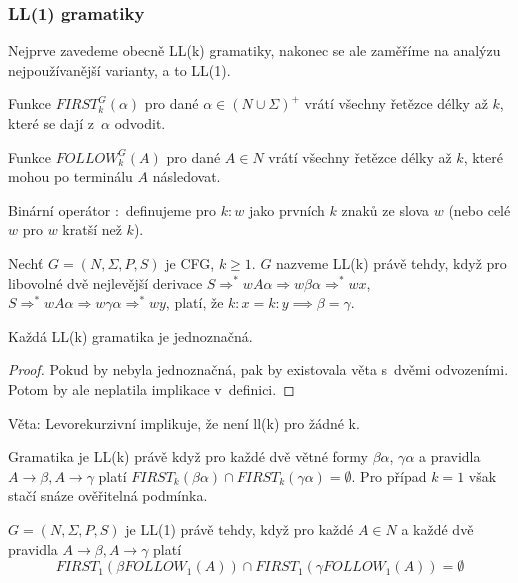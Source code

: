 \subsubsection{LL(1) gramatiky}


Nejprve zavedeme obecně LL(k) gramatiky, nakonec se ale zaměříme na
analýzu nejpoužívanější varianty, a to LL(1).

\begin{definition}
    Funkce $FIRST^G_k(\alpha)$ pro dané $\alpha \in (N \cup \Sigma)^+$
    vrátí všechny řetězce délky až $k$, které se dají z~$\alpha$
    odvodit.

    Funkce $FOLLOW^G_k(A)$ pro dané $A \in N$
    vrátí všechny řetězce délky až $k$, které mohou po terminálu $A$
    následovat.

    Binární operátor ${:}$ definujeme pro $k : w$ jako prvních $k$ znaků
    ze slova $w$ (nebo celé $w$ pro $w$ kratší než $k$).
\end{definition}

\begin{definition}
    Nechť $G = (N, \Sigma, P, S)$ je CFG, $k \geq 1$. $G$ nazveme LL(k)
    právě tehdy, když pro libovolné dvě nejlevější derivace
    $S \Rightarrow^* wA\alpha \Rightarrow w\beta\alpha \Rightarrow^* wx$,
    $S \Rightarrow^* wA\alpha \Rightarrow w\gamma\alpha \Rightarrow^* wy$,
    platí, že $k : x = k : y \implies \beta = \gamma$.
\end{definition}

\begin{theorem}
    Každá LL(k) gramatika je jednoznačná.
\end{theorem}

\begin{proof}
Pokud by nebyla jednoznačná, pak by existovala věta s~dvěmi odvozeními.
Potom by ale neplatila implikace v~definici.
\end{proof}

Věta: Levorekurzivní implikuje, že není ll(k) pro žádné k.

Gramatika je LL(k) právě když pro každé dvě větné formy $\beta \alpha$,
$\gamma \alpha$ a pravidla $A \to \beta, A \to \gamma$
platí $FIRST_k(\beta \alpha) \cap FIRST_k(\gamma \alpha) = \emptyset$.
Pro případ $k = 1$ však stačí snáze ověřitelná podmínka.

\begin{theorem}
    $G = (N, \Sigma, P, S)$ je LL(1) právě tehdy, když
    pro každé $A \in N$
    a každé dvě pravidla $A \to \beta, A \to \gamma$
    platí
    \[
        FIRST_1(\beta FOLLOW_1(A)) \cap FIRST_1(\gamma FOLLOW_1(A)) = \emptyset
    \]
\end{theorem}

